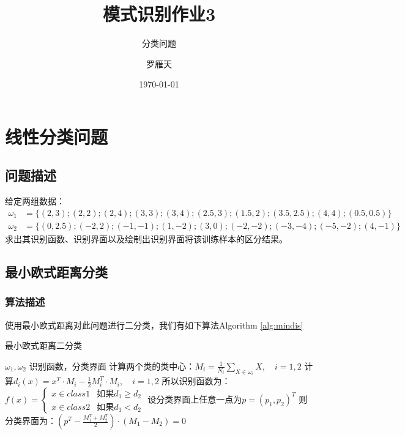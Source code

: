 \documentclass[cn]{elegantbook}
\title{模式识别作业3}
\subtitle{分类问题}
\author{罗雁天}
\institute{清华大学电子系}
\date{\today}
\begin{document}
\maketitle
\tableofcontents
\mainmatter
\hypersetup{pageanchor=true}
\chapter{线性分类问题}
\section{问题描述}
\noindent 给定两组数据：
\begin{equation}
\begin{aligned}
\omega_1&=\{(2,3); (2,2); (2,4); (3,3); (3,4); (2.5,3); (1.5,2); (3.5,2.5); (4,4); (0.5,0.5)\} \\
\omega_2&=\{(0,2.5); (-2,2); (-1,-1); (1,-2); (3,0); (-2,-2); (-3,-4); (-5,-2); (4,-1)\}
\end{aligned}
\end{equation}
求出其识别函数、识别界面以及绘制出识别界面将该训练样本的区分结果。

\section{最小欧式距离分类}
\subsection{算法描述}
\noindent 使用最小欧式距离对此问题进行二分类，我们有如下算法Algorithm \ref{alg:mindis}
\begin{algorithm}[htb]
	\caption{最小欧式距离二分类}
	\label{alg:mindis}
	\begin{algorithmic}[1]
		\Require $\omega_1, \omega_2$
		\Ensure 识别函数，分类界面
		\State 计算两个类的类中心：$M_i=\frac{1}{N_i}\sum_{X\in \omega_i}X,\quad i=1,2$
		\State 计算$d_i(x)=x^T\cdot M_i-\frac{1}{2}M_i^T\cdot M_i,\quad i=1,2$
		\State 所以识别函数为：$f(x)=\left\{\begin{array}{cc}
		x\in class1 & \mbox{如果}d_1\ge d_2 \\
		x\in class2 & \mbox{如果}d_1<d_2
		\end{array}\right.$
		\State 设分类界面上任意一点为$p=(p_1,p_2)^T$
		\State 则分类界面为：$\left(p^T-\frac{M_1^T+M_2^T}{2}\right)\cdot (M_1-M_2)=0$
	\end{algorithmic}
\end{algorithm}
\end{document}
